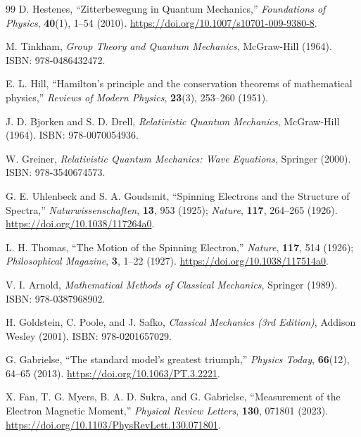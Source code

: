 \documentclass[%
 reprint,
 amsmath,amssymb,
 aps,
]{revtex4-1}
\numberwithin{equation}{section}%
\begin{document}
\begin{thebibliography}{99}
D. Hestenes, ``Zitterbewegung in Quantum Mechanics,'' \textit{Foundations of Physics}, \textbf{40}(1), 1--54 (2010). \href{https://doi.org/10.1007/s10701-009-9380-8}{https://doi.org/10.1007/s10701-009-9380-8}.

M. Tinkham, \textit{Group Theory and Quantum Mechanics}, McGraw-Hill (1964). ISBN: 978-0486432472.

E. L. Hill, ``Hamilton's principle and the conservation theorems of mathematical physics,'' \textit{Reviews of Modern Physics}, \textbf{23}(3), 253--260 (1951).

J. D. Bjorken and S. D. Drell, \textit{Relativistic Quantum Mechanics}, McGraw-Hill (1964). ISBN: 978-0070054936.

W. Greiner, \textit{Relativistic Quantum Mechanics: Wave Equations}, Springer (2000). ISBN: 978-3540674573.

G. E. Uhlenbeck and S. A. Goudsmit, ``Spinning Electrons and the Structure of Spectra,'' \textit{Naturwissenschaften}, \textbf{13}, 953 (1925); \textit{Nature}, \textbf{117}, 264--265 (1926). \href{https://www.ffn.ub.es/luisnavarro/nuevo_maletin/Uhlenbeck_Goudsmit_1926.pdf}{https://doi.org/10.1038/117264a0}.

L. H. Thomas, ``The Motion of the Spinning Electron,'' \textit{Nature}, \textbf{117}, 514 (1926); \textit{Philosophical Magazine}, \textbf{3}, 1--22 (1927). \href{https://www.nature.com/articles/117514a0}{https://doi.org/10.1038/117514a0}.

V. I. Arnold, \textit{Mathematical Methods of Classical Mechanics}, Springer (1989). ISBN: 978-0387968902.

H. Goldstein, C. Poole, and J. Safko, \textit{Classical Mechanics (3rd Edition)}, Addison Wesley (2001). ISBN: 978-0201657029.

G. Gabrielse, ``The standard model's greatest triumph,'' \textit{Physics Today}, \textbf{66}(12), 64--65 (2013). \href{https://doi.org/10.1063/PT.3.2221}{https://doi.org/10.1063/PT.3.2221}.

X. Fan, T. G. Myers, B. A. D. Sukra, and G. Gabrielse, ``Measurement of the Electron Magnetic Moment,'' \textit{Physical Review Letters}, \textbf{130}, 071801 (2023). \href{https://doi.org/10.1103/PhysRevLett.130.071801}{https://doi.org/10.1103/PhysRevLett.130.071801}.


\end{thebibliography}
\end{document}

